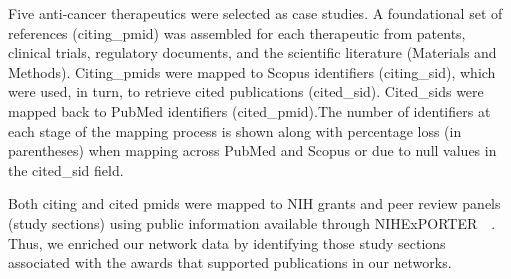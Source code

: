 \documentclass[10pt,letterpaper]{article}
\newlength\savedwidth
\newcommand\thickhline{\noalign{\global\savedwidth\arrayrulewidth\global\arrayrulewidth 2pt}%
\hline
\noalign{\global\arrayrulewidth\savedwidth}}
\begin{document}
\begin{table}[!ht]
\begin{adjustwidth}{-0.5in}{0in} %
\centering
\caption{{\bf Citation Counts and Mapping Between Bibliographic Databases}}
\vspace{2.5 mm}
\begin{flushleft}
 Five anti-cancer therapeutics were selected as case studies. A foundational set of references (citing\_pmid) was assembled for each therapeutic from patents, clinical trials, regulatory documents, and the scientific literature (Materials and Methods). Citing\_pmids were mapped to Scopus identifiers (citing\_sid), which were used, in turn, to retrieve cited publications (cited\_sid). Cited\_sids were mapped back to PubMed identifiers (cited\_pmid).The number of  identifiers at each stage of the mapping process is shown along with percentage loss (in parentheses) when mapping across PubMed and Scopus or due to null values in the cited\_sid field.
\end{flushleft}
\label{table2}
\end{adjustwidth}
\end{table}

Both citing and cited pmids were mapped to NIH grants and peer review panels (study sections) using public information available through NIHExPORTER~~\cite{bibNIHExPORTER}. Thus, we enriched our network data by identifying those study sections associated with the awards that supported publications in our networks. 
\end{document}
